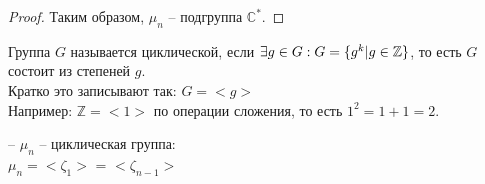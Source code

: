 \begin{normalsize}
\begin{proof}
    Таким образом, $\mu_n$ – подгруппа $\mathbb{C}^*$.
  \end{proof}

  \begin{conj}
    Группа $G$ называется циклической, если $\exists g\in G: \\ 
    G=\{ g^k | g\in\mathbb{Z} \}$, то есть $G$ состоит из степеней $g$. \\
    Кратко это записывают так:
    $G=<g>$ \\
    Например: $\mathbb{Z}=<1>$ по операции сложения, то есть $1^2 = 1+1 =2$.

  \end{conj}

  \notice – $\mu_n$ – циклическая группа: \\
  $\mu_n = <\zeta_1>$ = $<\zeta_{n-1}>$

\end{normalsize}
